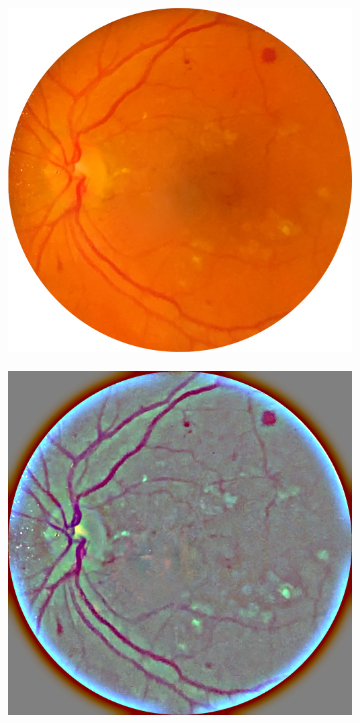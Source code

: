 \begin{figure}[!t]
\vspace{0.3cm} %

\begin{subfigure}[t]{0.45\textwidth}
  \includegraphics[width=\textwidth]{img/iphone_inp.PNG}
\end{subfigure}
\begin{subfigure}[t]{0.45\textwidth}
  \includegraphics[width=\textwidth]{img/iphone_proc_inp.PNG}
\end{subfigure}


\end{figure}

